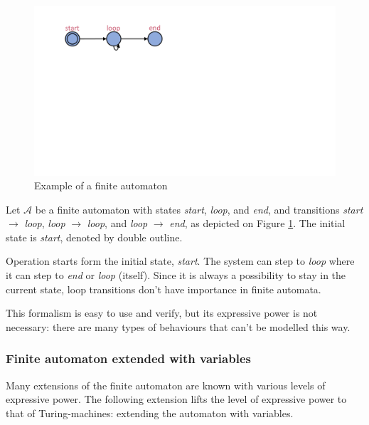 \begin{figure}
	\centering
	\begin{minipage}{0.5\textwidth}
		\includegraphics[width=\textwidth]{include/figures/loop_example_unclocked}%
		\caption{Example of a finite automaton}
		\label{fig:faex}
	\end{minipage}
\end{figure}

\begin{example}
	Let $\mathcal{A}$ be a finite automaton with states \emph{start}, \emph{loop}, and \emph{end}, and transitions  \emph{start} $\to$ \emph{loop}, \emph{loop} $\to$ \emph{loop}, and \emph{loop} $\to$ \emph{end}, as depicted on Figure \ref{fig:faex}. The initial state is \emph{start}, denoted by double outline.
	
	Operation starts form the initial state, \emph{start}. The system can step to \emph{loop} where it can step to \emph{end} or \emph{loop} (itself). Since it is always a possibility to stay in the current state, loop transitions don't have importance in finite automata.
\end{example}

This formalism is easy to use and verify, but its expressive power is not necessary: there are many types of behaviours that can't be modelled this way.

\subsubsection{Finite automaton extended with variables} \label{sec:extfa}

Many extensions of the finite automaton are known with various levels of expressive power. The following extension lifts the level of expressive power to that of Turing-machines: extending the automaton with variables.


